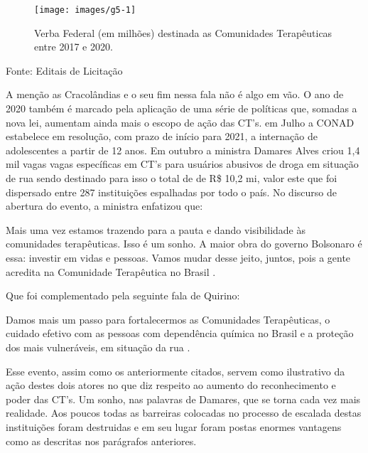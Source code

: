 \documentclass[
	12pt,				%
	oneside,			%
	a4paper,			%
	sumario=tradicional,
	english,			%
	brazil				%
	]{abntex2}
\newcommand{\bcenter}{\begin{center}}
\newcommand{\ecenter}{\end{center}}
\begin{document}
\begin{figure}[H]

{\centering \texttt{[image: images/g5-1]} 

}

\caption{Verba Federal (em milhões) destinada as Comunidades Terapêuticas entre 2017 e 2020.}\label{fig:g5}
\end{figure}
\bcenter

Fonte: Editais de Licitação
\ecenter

A menção as Cracolândias e o seu fim nessa fala não é algo em vão. O ano de 2020 também é marcado pela aplicação de uma série de políticas que, somadas a nova lei, aumentam ainda mais o escopo de ação das CT's. em Julho a CONAD estabelece em resolução, com prazo de início para 2021, a internação de adolescentes a partir de 12 anos. Em outubro a ministra Damares Alves criou 1,4 mil vagas vagas específicas em CT's para usuários abusivos de droga em situação de rua sendo destinado para isso o total de de R\$ 10,2 mi, valor este que foi dispersado entre 287 instituições espalhadas por todo o país. No discurso de abertura do evento, a ministra enfatizou que:
\begin{quoting}[rightmargin=0cm,leftmargin=4cm]
\begin{singlespace}
{\footnotesize
Mais uma vez estamos trazendo para a pauta e dando visibilidade às comunidades terapêuticas. Isso é um sonho. A maior obra do governo Bolsonaro é essa: investir em vidas e pessoas. Vamos mudar desse jeito, juntos, pois a gente acredita na Comunidade Terapêutica no Brasil \cite{gov2020}.}
\end{singlespace}
\end{quoting}
Que foi complementado pela seguinte fala de Quirino:
\begin{quoting}[rightmargin=0cm,leftmargin=4cm]
\begin{singlespace}
{\footnotesize
Damos mais um passo para fortalecermos as Comunidades Terapêuticas, o cuidado efetivo com as pessoas com dependência química no Brasil e a proteção dos mais vulneráveis, em situação da rua \cite{gov2020}.}
\end{singlespace}
\end{quoting}
Esse evento, assim como os anteriormente citados, servem como ilustrativo da ação destes dois atores no que diz respeito ao aumento do reconhecimento e poder das CT's. Um sonho, nas palavras de Damares, que se torna cada vez mais realidade. Aos poucos todas as barreiras colocadas no processo de escalada destas instituições foram destruidas e em seu lugar foram postas enormes vantagens como as descritas nos parágrafos anteriores.
\end{document}
